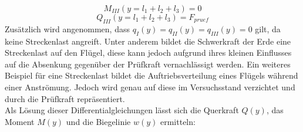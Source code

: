 \begin{equation}\label{eq:32}
	M_{III}(y=l_{1}+l_{2}+l_{3})=0
\end{equation}
\begin{equation}\label{eq:33}
	Q_{III}(y=l_{1}+l_{2}+l_{3})=F_{pruef}
\end{equation}
Zusätzlich wird angenommen, dass $q_{I}(y)=q_{II}(y)=q_{III}(y)=0$ gilt, da keine Streckenlast angreift. Unter anderem bildet die Schwerkraft der Erde eine Streckenlast auf den Flügel, diese kann jedoch aufgrund ihres kleinen Einflusses auf die Absenkung gegenüber der Prüfkraft vernachlässigt werden. Ein weiteres Beispiel für eine Streckenlast bildet die Auftriebsverteilung eines Flügels während einer Anströmung. Jedoch wird genau auf diese im Versuchsstand verzichtet und durch die Prüfkraft repräsentiert.\\

\noindent Als Lösung dieser Differentialgleichungen lässt sich die Querkraft $Q(y)$, das Moment $M(y)$ und die Biegelinie $w(y)$ ermitteln:\\

